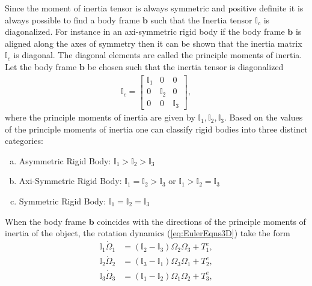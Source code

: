 \documentclass[graybox,envcountchap,sectrefs]{svmonoMuga}
\begin{document}
Since the moment of inertia tensor is always symmetric and positive definite it is always possible to find a body frame $\mathbf{b}$ such that the Inertia tensor $\mathbb{I}_c$ is diagonalized. For instance in an axi-symmetric rigid body if the body frame $\mathbf{b}$ is aligned along the axes of symmetry then it can be shown that the inertia matrix $\mathbb{I}_c$ is diagonal. The diagonal elements are called the principle moments of inertia.
Let the body frame $\mathbf{b}$ be chosen such that the inertia tensor is diagonalized
\begin{align}
\mathbb{I}_c=\left[ \begin{array}{ccc} \mathbb{I}_1 & 0 & 0\\ 0 & \mathbb{I}_2 & 0\\0 & 0 & \mathbb{I}_3\end{array}\right],
\end{align}
where the principle moments of inertia are given by $\mathbb{I}_1,\mathbb{I}_2,\mathbb{I}_3$.  Based on the values of the principle moments of inertia one can classify rigid bodies into three distinct categories:
\begin{enumerate}[(a)]
\item {Asymmetric Rigid Body:} $\mathbb{I}_1>\mathbb{I}_2>\mathbb{I}_3$
\item {Axi-Symmetric Rigid Body:} $\mathbb{I}_1=\mathbb{I}_2>\mathbb{I}_3$ or
$\mathbb{I}_1>\mathbb{I}_2=\mathbb{I}_3$
\item {Symmetric Rigid Body:} $\mathbb{I}_1=\mathbb{I}_2=\mathbb{I}_3$
\end{enumerate}

When the body frame $\mathbf{b}$ coincides with the directions of the principle moments of inertia of the object, the rotation dynamics (\ref{eq:EulerEqns3D}) take the form
\begin{align}
\mathbb{I}_1\dot{\Omega}_1 & =  (\mathbb{I}_2-\mathbb{I}_3)\Omega_2 \Omega_3 + T_1^e, \label{eq:AxiSym1}\\
\mathbb{I}_2\dot{\Omega}_2 & =  (\mathbb{I}_3-\mathbb{I}_1)\Omega_3 \Omega_1 + T_2^e, \label{eq:AxiSym2}\\
\mathbb{I}_3\dot{\Omega}_3 & =  (\mathbb{I}_1-\mathbb{I}_2)\Omega_1 \Omega_2 + T_3^e, \label{eq:AxiSym3}
\end{align}



\end{document}
